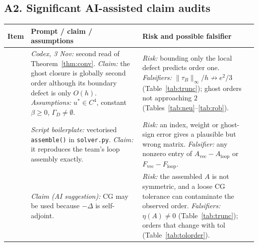 \documentclass[11pt,a4paper]{article}
\theoremstyle{palplain}
\theoremstyle{paldef}
\theoremstyle{palremark}
\begin{document}
\subsection*{A2. Significant AI-assisted claim audits}
\begin{table}[H]
\centering\small
\begin{tabular}{@{}>{\raggedright\arraybackslash}p{0.8cm}>{\raggedright\arraybackslash}p{7.4cm}>{\raggedright\arraybackslash}p{6.8cm}@{}}
\toprule
Item & Prompt / claim / assumptions & Risk and possible falsifier \\
\midrule
1 & \emph{Codex, 3 Nov:} second read of Theorem~\ref{thm:conv}. \emph{Claim:} the ghost closure is
  globally second order although its boundary defect is only $O(h)$.
  \emph{Assumptions:} $u^*\in C^4$, constant $\beta\ge0$, $\Gamma_D\neq\emptyset$. &
  \emph{Risk:} bounding only the local defect predicts order one.
  \emph{Falsifiers:} $\|\tau_B\|_\infty/h\not\to e^2/3$ (Table~\ref{tab:trunc}); ghost orders not
  approaching $2$ (Tables~\ref{tab:neu}--\ref{tab:rob}). \\
2 & \emph{Script boilerplate:} vectorised \texttt{assemble()} in \texttt{solver.py}.
  \emph{Claim:} it reproduces the team's loop assembly exactly. &
  \emph{Risk:} an index, weight or ghost-sign error gives a plausible but wrong matrix.
  \emph{Falsifier:} any nonzero entry of $A_{\mathrm{vec}}-A_{\mathrm{loop}}$ or
  $F_{\mathrm{vec}}-F_{\mathrm{loop}}$. \\
3 & \emph{Claim (AI suggestion):} CG may be used because $-\Delta$ is self-adjoint. &
  \emph{Risk:} the assembled $A$ is not symmetric, and a loose CG tolerance can contaminate the
  observed order. \emph{Falsifiers:} $\eta(A)\neq0$ (Table~\ref{tab:trunc}); orders that change
  with tol (Table~\ref{tab:tolorder}). \\
\bottomrule
\end{tabular}
\end{table}
\end{document}
